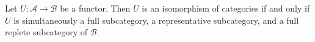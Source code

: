 Let $U: \mathcal{A} \to \mathcal{B}$ be a functor. Then $U$ is an isomorphism of categories if and only if $U$ is simultaneously a full subcategory, a representative subcategory, and a full replete subcategory of $\mathcal{B}$.
